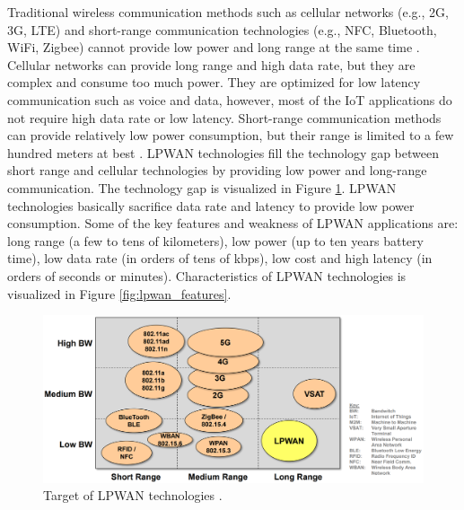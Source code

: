 Traditional wireless communication methods such as cellular networks (e.g., 2G, 3G, LTE) and short-range communication technologies (e.g., NFC, Bluetooth, WiFi, Zigbee) cannot provide low power and long range at the same time \cite{finnegan2018comparative}. Cellular networks can provide long range and high data rate, but they are complex and consume too much power. They are optimized for low latency communication such as voice and data, however, most of the IoT applications do not require high data rate or low latency. Short-range communication methods can provide relatively low power consumption, but their range is limited to a few hundred meters at best \cite{7815384}. LPWAN technologies fill the technology gap between short range and cellular technologies by providing low power and long-range communication. The technology gap is visualized in Figure \ref{fig:lpwan_gap}. LPWAN technologies basically sacrifice data rate and latency to provide low power consumption. Some of the key features and weakness of LPWAN applications are: long range (a few to tens of kilometers), low power (up to ten years battery time), low data rate (in orders of tens of kbps), low cost and high latency (in orders of seconds or minutes). Characteristics of LPWAN technologies is visualized in Figure \ref{fig:lpwan_features}.

\begin{figure}[h]
\centering
\includegraphics[width=\linewidth]{fig/lpwan_gap.png}
\vspace*{3mm}
\caption{Target of LPWAN technologies \cite{peteregli_lpwan}.}
\label{fig:lpwan_gap}
\end{figure}

